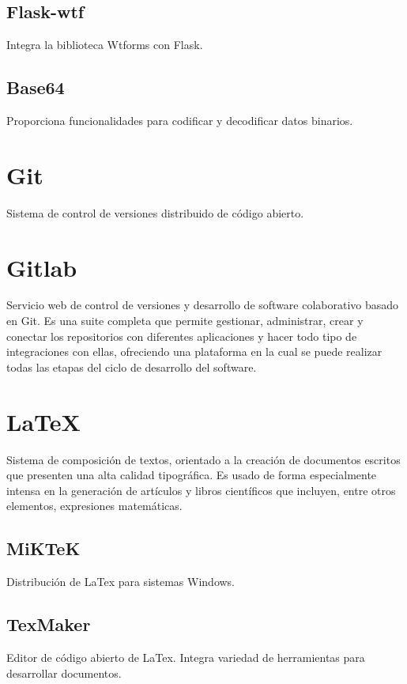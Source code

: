 \subsection{Flask-wtf}
Integra la biblioteca Wtforms con Flask.

\subsection{Base64}
Proporciona funcionalidades para codificar y decodificar datos binarios.

\section{Git}
Sistema de control de versiones distribuido de código abierto.

\section{Gitlab}
Servicio web de control de versiones y desarrollo de software colaborativo basado en Git. Es una suite completa que permite gestionar, administrar, crear y conectar los repositorios con diferentes aplicaciones y hacer todo tipo de integraciones con ellas, ofreciendo una plataforma en la cual se puede realizar todas las etapas del ciclo de desarrollo del software.

\section{LaTeX}
Sistema de composición de textos, orientado a la creación de documentos escritos que presenten una alta calidad tipográfica. Es usado de forma especialmente intensa en la generación de artículos y libros científicos que incluyen, entre otros elementos, expresiones matemáticas.

\subsection{MiKTeK}
Distribución de LaTex para sistemas Windows.

\subsection{TexMaker}
Editor de código abierto de LaTex. Integra variedad de herramientas para desarrollar documentos.
